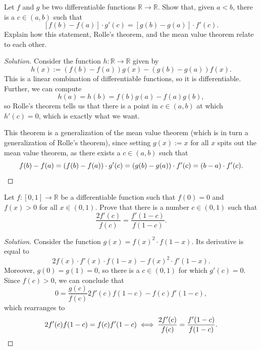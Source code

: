 \documentclass[11pt]{scrartcl}
\providecommand{\RR}{\mathbb R}
\newenvironment{soln}{\begin{proof}[Solution]}{\end{proof}}
\begin{document}
\setcounter{problem}{6}

\begin{problem}
	Let $f$ and $g$ be two differentiable functions $\RR\to\RR$.
	Show that, given $a < b$, there is a $c\in(a, b)$ such that
	\[[f(b) - f(a)]\cdot g'(c) = [g(b) - g(a)]\cdot f'(c).\]
	Explain how this statement, Rolle's theorem, and the mean value theorem
	relate to each other.
\end{problem}

\begin{soln}
	Consider the function $h\colon\RR\to\RR$ given by
	\[h(x) := (f(b) - f(a))g(x) - (g(b) - g(a))f(x).\]
	This is a linear combination of differentiable functions,
	so it is differentiable. Further, we can compute
	\[h(a) = h(b) = f(b)g(a) - f(a)g(b),\]
	so Rolle's theorem tells us that there is a point in $c\in (a, b)$
	at which $h'(c) = 0$, which is exactly what we want.
	
	This theorem is a generalization of the mean value theorem
	(which is in turn a generalization of Rolle's theorem),
	since setting $g(x) := x$ for all $x$ spits out the mean value theorem,
	as there exists a $c\in(a, b)$ such that
	\[f(b) - f(a) = (f(b) - f(a))\cdot g'(c) = (g(b) - g(a))\cdot f'(c)
	= (b - a)\cdot f'(c).\qedhere\]
\end{soln}

\begin{problem}
	Let $f\colon[0,1]\to\RR$ be a differentiable function
	such that $f(0) = 0$ and $f(x) > 0$ for all $x\in(0,1)$.
	Prove that there is a number $c\in(0,1)$ such that
	\[\frac{2f'(c)}{f(c)} = \frac{f'(1-c)}{f(1-c)}.\]
\end{problem}

\begin{soln}
	Consider the function $g(x) = f(x)^2\cdot f(1-x)$.
	Its derivative is equal to
	\[2f(x)\cdot f'(x)\cdot f(1-x) - f(x)^2\cdot f'(1-x).\]
	Moreover, $g(0) = g(1) = 0$, so there is a $c\in(0,1)$
	for which $g'(c) = 0$. Since $f(c) > 0$, we can conclude that
	\[0 = \frac{g(c)}{f(c)}
	2f'(c)f(1-c) - f(c)f'(1-c),\]
	which rearranges to
	\[2f'(c)f(1-c) = f(c)f'(1-c) \iff
	\frac{2f'(c)}{f(c)} = \frac{f'(1-c)}{f(1-c)}.\qedhere\]
\end{soln}
\end{document}
